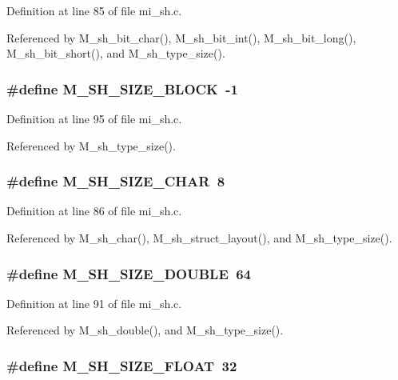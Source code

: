 Definition at line 85 of file mi\_\-sh.c.

Referenced by M\_\-sh\_\-bit\_\-char(), M\_\-sh\_\-bit\_\-int(), M\_\-sh\_\-bit\_\-long(), M\_\-sh\_\-bit\_\-short(), and M\_\-sh\_\-type\_\-size().
\subsubsection{\setlength{\rightskip}{0pt plus 5cm}\#define M\_\-SH\_\-SIZE\_\-BLOCK~-1}\label{mi__sh_8c_0d03b9af347795c70dfba16570f95e75}




Definition at line 95 of file mi\_\-sh.c.

Referenced by M\_\-sh\_\-type\_\-size().
\subsubsection{\setlength{\rightskip}{0pt plus 5cm}\#define M\_\-SH\_\-SIZE\_\-CHAR~8}\label{mi__sh_8c_338eea8edbe507eaed0333c4bfd70a0c}




Definition at line 86 of file mi\_\-sh.c.

Referenced by M\_\-sh\_\-char(), M\_\-sh\_\-struct\_\-layout(), and M\_\-sh\_\-type\_\-size().
\subsubsection{\setlength{\rightskip}{0pt plus 5cm}\#define M\_\-SH\_\-SIZE\_\-DOUBLE~64}\label{mi__sh_8c_b00a49d04b64376849f4f5cff3bdafb7}




Definition at line 91 of file mi\_\-sh.c.

Referenced by M\_\-sh\_\-double(), and M\_\-sh\_\-type\_\-size().
\subsubsection{\setlength{\rightskip}{0pt plus 5cm}\#define M\_\-SH\_\-SIZE\_\-FLOAT~32}\label{mi__sh_8c_427c4246977236a6f1bd6be35c15f9cb}




